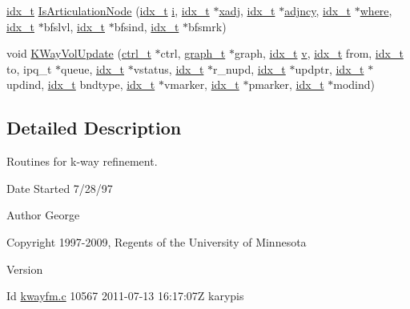 \begin{DoxyCompactItemize}
\hyperlink{a00876_aaa5262be3e700770163401acb0150f52}{idx\+\_\+t} \hyperlink{a00221_af791bf8cc50b3b218224e0560decc422}{Is\+Articulation\+Node} (\hyperlink{a00876_aaa5262be3e700770163401acb0150f52}{idx\+\_\+t} \hyperlink{a00608_afb6aca53df96564f2adf086c942453ec}{i}, \hyperlink{a00876_aaa5262be3e700770163401acb0150f52}{idx\+\_\+t} $\ast$\hyperlink{a00879_aa8fc7f75458e38e1e2979ed6db639164}{xadj}, \hyperlink{a00876_aaa5262be3e700770163401acb0150f52}{idx\+\_\+t} $\ast$\hyperlink{a00879_a20c068e3ebdd8f9889fb82c1f677d679}{adjncy}, \hyperlink{a00876_aaa5262be3e700770163401acb0150f52}{idx\+\_\+t} $\ast$\hyperlink{a00879_a7a355801f721e9d8d4ae03590a3a56b0}{where}, \hyperlink{a00876_aaa5262be3e700770163401acb0150f52}{idx\+\_\+t} $\ast$bfslvl, \hyperlink{a00876_aaa5262be3e700770163401acb0150f52}{idx\+\_\+t} $\ast$bfsind, \hyperlink{a00876_aaa5262be3e700770163401acb0150f52}{idx\+\_\+t} $\ast$bfsmrk)
\item 
void \hyperlink{a00221_ac4e797b3ea2db37f88f436fc6481b989}{K\+Way\+Vol\+Update} (\hyperlink{a00742}{ctrl\+\_\+t} $\ast$ctrl, \hyperlink{a00734}{graph\+\_\+t} $\ast$graph, \hyperlink{a00876_aaa5262be3e700770163401acb0150f52}{idx\+\_\+t} \hyperlink{a00605_ac4055e3a20b6b3af3d10590ea446ef6c}{v}, \hyperlink{a00876_aaa5262be3e700770163401acb0150f52}{idx\+\_\+t} from, \hyperlink{a00876_aaa5262be3e700770163401acb0150f52}{idx\+\_\+t} to, ipq\+\_\+t $\ast$queue, \hyperlink{a00876_aaa5262be3e700770163401acb0150f52}{idx\+\_\+t} $\ast$vstatus, \hyperlink{a00876_aaa5262be3e700770163401acb0150f52}{idx\+\_\+t} $\ast$r\+\_\+nupd, \hyperlink{a00876_aaa5262be3e700770163401acb0150f52}{idx\+\_\+t} $\ast$updptr, \hyperlink{a00876_aaa5262be3e700770163401acb0150f52}{idx\+\_\+t} $\ast$updind, \hyperlink{a00876_aaa5262be3e700770163401acb0150f52}{idx\+\_\+t} bndtype, \hyperlink{a00876_aaa5262be3e700770163401acb0150f52}{idx\+\_\+t} $\ast$vmarker, \hyperlink{a00876_aaa5262be3e700770163401acb0150f52}{idx\+\_\+t} $\ast$pmarker, \hyperlink{a00876_aaa5262be3e700770163401acb0150f52}{idx\+\_\+t} $\ast$modind)
\end{DoxyCompactItemize}


\subsection{Detailed Description}
Routines for k-\/way refinement. 

\begin{DoxyDate}{Date}
Started 7/28/97 
\end{DoxyDate}
\begin{DoxyAuthor}{Author}
George 

Copyright 1997-\/2009, Regents of the University of Minnesota 
\end{DoxyAuthor}
\begin{DoxyVersion}{Version}

\end{DoxyVersion}
\begin{DoxyParagraph}{Id}
\hyperlink{a00221}{kwayfm.\+c} 10567 2011-\/07-\/13 16\+:17\+:07Z karypis 
\end{DoxyParagraph}


